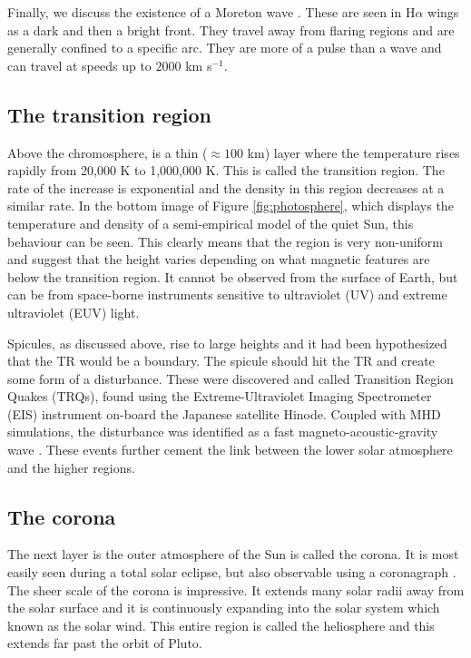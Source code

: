     Finally, we discuss the existence of a Moreton wave \citep{1960AJ.....65U.494M}.
    These are seen in H$\alpha$ wings as a dark and then a bright front.
    They travel away from flaring regions and are generally confined to a specific arc.
    They are more of a pulse than a wave and can travel at speeds up to $2000$ km s$^{-1}$.
            
\subsection{The transition region}

    Above the chromosphere, is a thin ($\approx100$ km) layer where the temperature rises rapidly from 20,000 K to 1,000,000 K.
    This is called the transition region.
    The rate of the increase is exponential and the density in this region decreases at a similar rate.
    In the bottom image of Figure \ref{fig:photosphere}, which displays the temperature and density of a semi-empirical model of the quiet Sun, this behaviour can be seen.
    This clearly means that the region is very non-uniform and \cite{tian2009solar} suggest that the height varies depending on what magnetic features are below the transition region.
    It cannot be observed from the surface of Earth, but can be from space-borne instruments sensitive to ultraviolet (UV) and extreme ultraviolet (EUV) light.
    
    Spicules, as discussed above, rise to large heights and it had been hypothesized that the TR would be a boundary.
    The spicule should hit the TR and create some form of a disturbance.
    These were discovered and called Transition Region Quakes (TRQs), found using the Extreme-Ultraviolet Imaging Spectrometer (EIS) instrument on-board the Japanese satellite Hinode.
    Coupled with MHD simulations, the disturbance was identified as a fast magneto-acoustic-gravity wave \citep{0004-637X-743-1-14}.
    These events further cement the link between the lower solar atmosphere and the higher regions.
    
\subsection{The corona}
\label{corona}

    The next layer is the outer atmosphere of the Sun is called the corona.
    It is most easily seen during a total solar eclipse, but also observable using a coronagraph \citep{markus2004physics}.
    The sheer scale of the corona is impressive.
    It extends many solar radii away from the solar surface and it is continuously expanding into the solar system which known as the solar wind.
    This entire region is called the heliosphere and this extends far past the orbit of Pluto.
    
